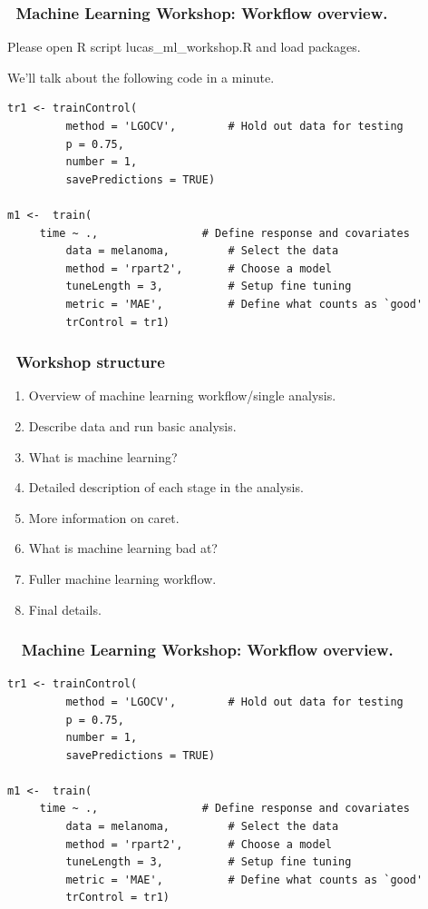 \documentclass[handout, aspectratio = 169]{beamer}
\begin{document}
\begin{frame}[fragile]
\frametitle{\insertframenumber~Machine Learning Workshop: Workflow overview.}
\footnotesize{
\vspace{3mm}
{\color{gray}Please open R script lucas\_ml\_workshop.R and load packages.

We'll talk about the following code in a minute.}
\vspace{1mm}
\begin{Verbatim}
tr1 <- trainControl(
         method = 'LGOCV',        # Hold out data for testing
         p = 0.75,
         number = 1,
         savePredictions = TRUE)

m1 <-  train(
	 time ~ .,                # Define response and covariates
         data = melanoma,         # Select the data
         method = 'rpart2',       # Choose a model
         tuneLength = 3,          # Setup fine tuning
         metric = 'MAE',          # Define what counts as `good'
         trControl = tr1)

\end{Verbatim}
}
\end{frame} 




\begin{frame}
\frametitle{\insertframenumber~Workshop structure}
\begin{enumerate}
\item Overview of machine learning workflow/single analysis.
\item Describe data and run basic analysis.
\item What is machine learning?
\item Detailed description of each stage in the analysis.
\item More information on caret.
\item What is machine learning bad at?
\item Fuller machine learning workflow.
\item Final details.
\end{enumerate}

\end{frame} 


\begin{frame}[fragile]
\frametitle{\insertframenumber~ Machine Learning Workshop: Workflow overview.}

\vspace{2mm}
\begin{Verbatim}
tr1 <- trainControl(
         method = 'LGOCV',        # Hold out data for testing
         p = 0.75,
         number = 1,
         savePredictions = TRUE)

m1 <-  train(
	 time ~ .,                # Define response and covariates
         data = melanoma,         # Select the data
         method = 'rpart2',       # Choose a model
         tuneLength = 3,          # Setup fine tuning
         metric = 'MAE',          # Define what counts as `good'
         trControl = tr1)

\end{Verbatim}

\end{frame} 
\end{document}

